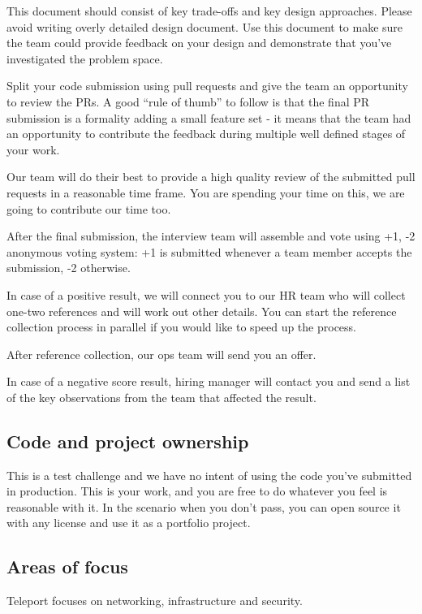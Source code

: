 \documentclass{article}
\begin{document}
This document should consist of key trade-offs and key design approaches. Please avoid writing overly detailed design document. Use this document to make sure the team could provide feedback on your design and demonstrate that you've investigated the problem space.

Split your code submission using pull requests and give the team an opportunity to review the PRs. A good “rule of thumb” to follow is that the final PR submission is a formality adding a small feature set - it means that the team had an opportunity to contribute the feedback during multiple well defined stages of your work.

Our team will do their best to provide a high quality review of the submitted pull requests in a reasonable time frame. You are spending your time on this, we are going to contribute our time too.

After the final submission, the interview team will assemble and vote using +1, -2 anonymous voting system: +1 is submitted whenever a team member accepts the submission, -2 otherwise.

In case of a positive result, we will connect you to our HR team who will collect one-two references and will work out other details. You can start the reference collection process in parallel if you would like to speed up the process.

After reference collection, our ops team will send you an offer.

In case of a negative score result, hiring manager will contact you and send a list of the key observations from the team that affected the result.

\subsection{Code and project ownership}

This is a test challenge and we have no intent of using the code you've submitted in production.
This is your work, and you are free to do whatever you feel is reasonable with it.
In the scenario when you don't pass, you can open source it with any license and use it as a portfolio project.

\subsection{Areas of focus}

Teleport focuses on networking, infrastructure and security.
\end{document}

